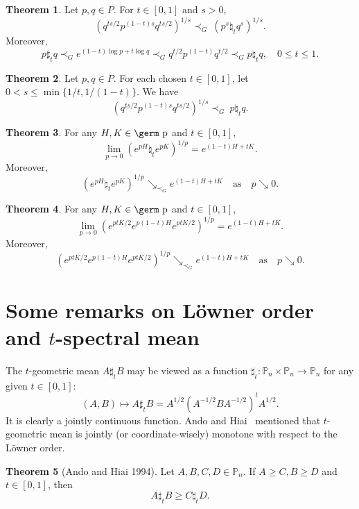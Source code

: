 \documentclass[12pt, reqno]{amsart}
\numberwithin{equation}{section}
\theoremstyle{definition}
\newtheorem{theorem}{Theorem}[section]
\renewcommand{\ge}{\geqslant}
\renewcommand{\le}{\leqslant}
\def\p{\mbox{\germ p}}
\def\P{\mathbb P}
\begin{document}
\begin{theorem}
Let $p, q \in P$. For $t \in [0, 1]$ and  $ s>0$,
\[
 \left(q^{ts/2}p^{(1-t)s}q^{ts/2} \right)^{1/s}{\prec_G} \ (p^s \natural_t q^s)^{1/s}.
\]
Moreover,
\[
p \sharp_t q\prec_G e^{(1-t) \log p + t \log q} \prec_G q^{t/2}p^{(1-t)}q^{t/2} \prec_G  p \natural_t q,\quad 0\le t\le 1.
\]
\end{theorem}


\begin{theorem}
Let $p, q \in P$. For each chosen $t\in [0,1]$, let $0 < s \le \min\{1/t, 1/(1-t)\}$. We have
\[
 \left(q^{ts/2}p^{(1-t)s}q^{ts/2} \right)^{1/s}{\prec_G} \ p \natural_t q.
\]
\end{theorem}



\begin{theorem}
For any $H,K \in \p $ and $t\in [0, 1]$,
\[	 
\lim_{p \to 0} (e^{pH} \natural_t e^{pK})^{1/p} = e^{(1-t)H+tK}.
\]
Moreover, 
\[(e^{pH} \natural_t e^{pK})^{1/p} \searrow_{\prec_G} e^{(1-t)H+tK} \quad \text{as} \quad p\searrow 0.\]
\end{theorem}

\begin{theorem}
For any $H,K \in \p $ and $t\in [0, 1]$,
 \[
 \lim_{p \to 0} (e^{ptK/2}e^{p(1-t)H}e^{ptK/2})^{1/p} = e^{(1-t)H+t K}.
 \]
Moreover,
\[(e^{ptK/2}e^{p(1-t)H}e^{ptK/2})^{1/p}\searrow_{\prec_G} e^{(1-t)H+tK}\quad \text{as} \quad p\searrow 0.\]
\end{theorem}


\section{Some remarks on L\"owner order and $t$-spectral mean}

The $t$-geometric mean $A \sharp_t B$ may be viewed as a function $\sharp_t: \P_n\times \P_n\to \P_n$ for any given $t\in[0,1]$:
$$(A,B) \mapsto A \sharp_t B=A^{1/2}(A^{-1/2}BA^{-1/2})^{t}A^{1/2}.$$ It is clearly a jointly continuous function.
Ando and Hiai~\cite [p.118]{AH94} mentioned that $t$-geometric mean is jointly (or coordinate-wisely) monotone with respect to the L\"owner order. 

\begin{theorem}[Ando and Hiai {1994}] %
\label{lem:geo_lowner} 
Let $A, B, C, D\in \P_n$. If $A\ge C, B\ge D$ and $t\in [0,1]$, then
\begin{equation}\label{Kim-LH}
A\sharp_t B \ge C\sharp_t D.
\end{equation}
\end{theorem}
\end{document}
